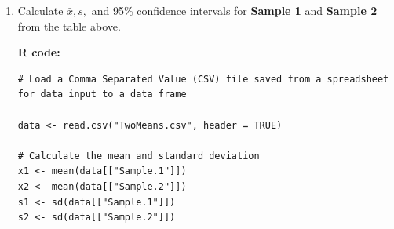 \begin{enumerate}
\begin{lstlisting}
cat("Raw data:","\n")

cat("Sample 1:", data[["Sample.1"]]," Mean: ", x1, " Std. Dev: ", s1, "\n\n")

cat("Sample 2:", data[["Sample.2"]]," Mean: ", x2, " Std. Dev: ", s2, "\n\n")

cat("The Student's t value is:", result,"\n\n")

if (result > tablevalue)  

	cat(" which is greater than the critical value,", tablevalue, "thus we must reject the null hypothesis as this is evidence that the two samples are significantly different, at the", ConfLevel*100, "% confidence level.") 
else 

	cat(" which is less than the critical value,", tablevalue, "so we must accept the null hypothesis as we have no evidence that the samples are different at the", ConfLevel*100, "% confidence level.")
\end{lstlisting}


\textbf{Output:}


{\small \texttt{Student's t-test to compare two sample means} 

\texttt{Raw data: }\\
\texttt{Sample 1: 14.59 15.01 15.47 15.56 15.05}\\
\texttt{Mean:  15.136   Std. Dev:  0.3913822}

\texttt{Sample 2: 14.62 14.69 14.95 14.76 14.87}\\
\texttt{Mean:  14.778   Std. Dev:    0.1333042}

\texttt{The Student's t value is: 2.738095}

\texttt{which is greater than the critical value, 2.228139 thus 
we must reject the null hypothesis as this is evidence 
that the two samples are significantly  different, at 
the 95\% confidence level.}}

\newpage
	\item Calculate $ \bar{x}, s, $ and 95\% confidence intervals for \textbf{Sample 1} and \textbf{Sample 2} from the table above.

\textbf{R code:}	
\begin{lstlisting}
# Load a Comma Separated Value (CSV) file saved from a spreadsheet for data input to a data frame

data <- read.csv("TwoMeans.csv", header = TRUE)

# Calculate the mean and standard deviation 
x1 <- mean(data[["Sample.1"]])
x2 <- mean(data[["Sample.2"]])
s1 <- sd(data[["Sample.1"]])
s2 <- sd(data[["Sample.2"]])


\end{lstlisting}
\end{enumerate}
